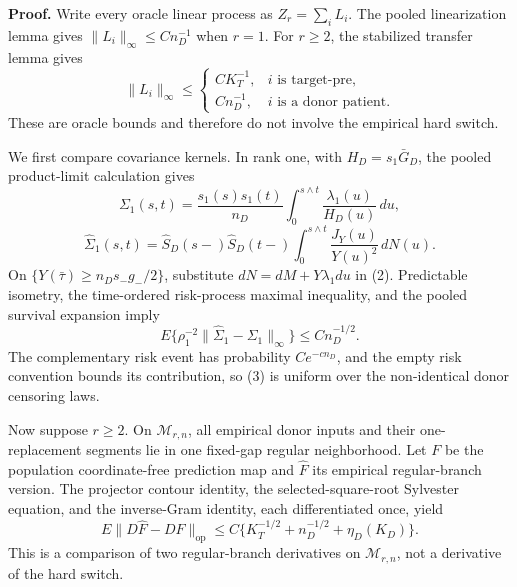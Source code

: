 \textbf{Proof.}
Write every oracle linear process as \(Z_r=\sum_iL_i\).  The pooled
linearization lemma gives \(\|L_i\|_\infty\le Cn_D^{-1}\) when \(r=1\).
For \(r\ge2\), the stabilized transfer lemma gives
\[
 \|L_i\|_\infty\le
 \begin{cases}
 CK_T^{-1},&i\text{ is target-pre},\\
 Cn_D^{-1},&i\text{ is a donor patient}.
 \end{cases}                                             \tag{1}
\]
These are oracle bounds and therefore do not involve the empirical hard
switch.

We first compare covariance kernels.  In rank one, with
\(H_D=s_1\bar G_D\), the pooled product-limit calculation gives
\[
 \Sigma_1(s,t)=\frac{s_1(s)s_1(t)}{n_D}
 \int_0^{s\wedge t}\frac{\lambda_1(u)}{H_D(u)}\,du,
\]
\[
 \widehat\Sigma_1(s,t)=\widehat S_D(s-)\widehat S_D(t-)
 \int_0^{s\wedge t}\frac{J_Y(u)}{Y(u)^2}\,dN(u).        \tag{2}
\]
On \(\{Y(\bar\tau)\ge n_Ds_-g_-/2\}\), substitute
\(dN=dM+Y\lambda_1du\) in (2).  Predictable isometry, the time-ordered
risk-process maximal inequality, and the pooled survival expansion imply
\[
 E\{\rho_1^{-2}\|\widehat\Sigma_1-\Sigma_1\|_\infty\}
 \le Cn_D^{-1/2}.                                       \tag{3}
\]
The complementary risk event has probability \(Ce^{-cn_D}\), and the empty
risk convention bounds its contribution, so (3) is uniform over the
non-identical donor censoring laws.

Now suppose \(r\ge2\).  On \(\mathcal M_{r,n}\), all empirical donor inputs
and their one-replacement segments lie in one fixed-gap regular neighborhood.
Let \(F\) be the population coordinate-free prediction map and
\(\widehat F\) its empirical regular-branch version.  The projector contour
identity, the selected-square-root Sylvester equation, and the inverse-Gram
identity, each differentiated once, yield
\[
 E\|D\widehat F-DF\|_{\mathrm{op}}
 \le C\{K_T^{-1/2}+n_D^{-1/2}+\eta_D(K_D)\}.            \tag{4}
\]
This is a comparison of two regular-branch derivatives on
\(\mathcal M_{r,n}\), not a derivative of the hard switch.

